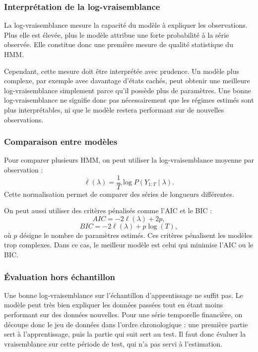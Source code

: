 \documentclass[11pt]{article}
\begin{document}
\subsubsection{Interprétation de la log-vraisemblance}

La log-vraisemblance mesure la capacité du modèle à expliquer les observations. Plus elle est élevée, plus le modèle attribue une forte probabilité à la série observée. Elle constitue donc une première mesure de qualité statistique du HMM.

Cependant, cette mesure doit être interprétée avec prudence. Un modèle plus complexe, par exemple avec davantage d'états cachés, peut obtenir une meilleure log-vraisemblance simplement parce qu'il possède plus de paramètres. Une bonne log-vraisemblance ne signifie donc pas nécessairement que les régimes estimés sont plus interprétables, ni que le modèle restera performant sur de nouvelles observations.

\subsubsection{Comparaison entre modèles}

Pour comparer plusieurs HMM, on peut utiliser la log-vraisemblance moyenne par observation :
\[
\overline{\ell}(\lambda)
=
\frac{1}{T}\log P(Y_{1:T}\mid \lambda).
\]
Cette normalisation permet de comparer des séries de longueurs différentes.

On peut aussi utiliser des critères pénalisés comme l'AIC et le BIC :
\[
AIC = -2\ell(\lambda)+2p,
\]
\[
BIC = -2\ell(\lambda)+p\log(T),
\]
où \(p\) désigne le nombre de paramètres estimés. Ces critères pénalisent les modèles trop complexes. Dans ce cas, le meilleur modèle est celui qui minimise l'AIC ou le BIC.

\subsubsection{Évaluation hors échantillon}

Une bonne log-vraisemblance sur l'échantillon d'apprentissage ne suffit pas. Le modèle peut très bien expliquer les données passées tout en étant moins performant sur des données nouvelles. Pour une série temporelle financière, on découpe donc le jeu de données dans l'ordre chronologique : une première partie sert à l'apprentissage, puis la partie qui suit sert au test. Il faut donc évaluer la vraisemblance sur cette période de test, qui n'a pas servi à l'estimation.
\end{document}
